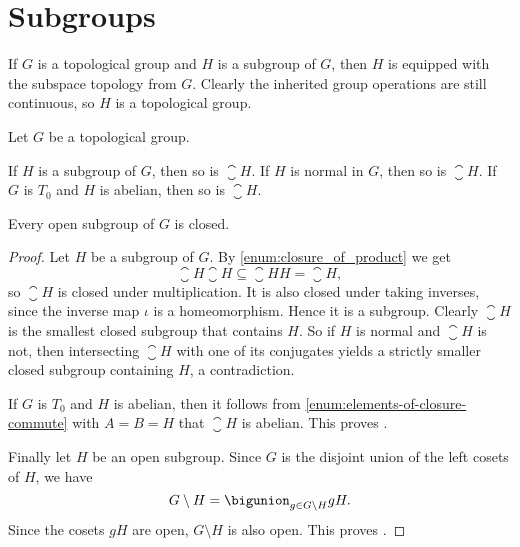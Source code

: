 \documentclass[article, a4paper, 11pt, oneside]{memoir}
\numberwithin{equation}{chapter}
\begin{document}
\section{Subgroups}

If $G$ is a topological group and $H$ is a subgroup of $G$, then $H$ is equipped with the subspace topology from $G$. Clearly the inherited group operations are still continuous, so $H$ is a topological group.

\begin{proposition}
    Let $G$ be a topological group.
    \begin{enumprop}
        \item \label{enum:closure_of_subgroup} If $H$ is a subgroup of $G$, then so is $\closure{H}$. If $H$ is normal in $G$, then so is $\closure{H}$. If $G$ is $T_0$ and $H$ is abelian, then so is $\closure{H}$.
        
        \item \label{enum:open_subgroup_is_closed} Every open subgroup of $G$ is closed.
    \end{enumprop}
\end{proposition}

\begin{proof}
    Let $H$ be a subgroup of $G$. By \cref{enum:closure_of_product} we get
    \begin{equation*}
        \closure{H} \closure{H} \subseteq \closure{HH} = \closure{H},
    \end{equation*}
    so $\closure{H}$ is closed under multiplication. It is also closed under taking inverses, since the inverse map $\iota$ is a homeomorphism. Hence it is a subgroup. Clearly $\closure{H}$ is the smallest closed subgroup that contains $H$. So if $H$ is normal and $\closure{H}$ is not, then intersecting $\closure{H}$ with one of its conjugates yields a strictly smaller closed subgroup containing $H$, a contradiction.

    If $G$ is $T_0$ and $H$ is abelian, then it follows from \cref{enum:elements-of-closure-commute} with $A = B = H$ that $\closure{H}$ is abelian. This proves .

    Finally let $H$ be an open subgroup. Since $G$ is the disjoint union of the left cosets of $H$, we have
    \begin{equation*}
        G \setminus H
            = \bigunion_{g \in G \setminus H} gH.
    \end{equation*}
    Since the cosets $gH$ are open, $G \setminus H$ is also open. This proves .
\end{proof}
\end{document}
